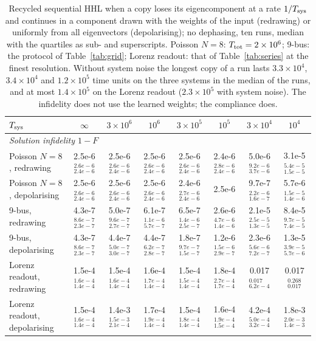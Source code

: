 \documentclass[journal]{IEEEtran}
\begin{document}
\begin{table}[t]
\caption{Recycled sequential HHL when a copy loses its eigencomponent at a rate $1/T_{\rm sys}$ and continues in a component drawn with the weights of the input (redrawing) or uniformly from all eigenvectors (depolarising); no dephasing, ten runs, median with the quartiles as sub- and superscripts. Poisson $N=8$: $T_{\rm tot}=2\times10^6$; 9-bus: the protocol of Table~\ref{tab:grid}; Lorenz readout: that of Table~\ref{tab:series} at the finest resolution. Without system noise the longest copy of a run lasts $3.3\times10^4$, $3.4\times10^4$ and $1.2\times10^5$ time units on the three systems in the median of the runs, and at most $1.4\times10^5$ on the Lorenz readout ($2.3\times10^5$ with system noise). The infidelity does not use the learned weights; the compliance does.}
\label{tab:system}
\centering\footnotesize\renewcommand{\arraystretch}{1.3}
\setlength{\tabcolsep}{3pt}
\begin{tabular}{lccccccc}
\toprule
$T_{\rm sys}$ & $\infty$ & $3\times10^6$ & $10^6$ & $3\times10^5$ & $10^5$ & $3\times10^4$ & $10^4$\\
\midrule
\multicolumn{8}{l}{\emph{Solution infidelity $1-F$}}\\
Poisson $N=8$, redrawing & 2.5e-6$_{2.4e-6}^{2.6e-6}$ & 2.5e-6$_{2.4e-6}^{2.6e-6}$ & 2.5e-6$_{2.4e-6}^{2.6e-6}$ & 2.5e-6$_{2.4e-6}^{2.6e-6}$ & 2.4e-6$_{2.4e-6}^{2.8e-6}$ & 5.0e-6$_{3.7e-6}^{9.2e-6}$ & 3.1e-5$_{1.5e-5}^{5.4e-5}$\\
Poisson $N=8$, depolarising & 2.5e-6$_{2.4e-6}^{2.6e-6}$ & 2.5e-6$_{2.4e-6}^{2.6e-6}$ & 2.5e-6$_{2.4e-6}^{2.6e-6}$ & 2.4e-6$_{2.4e-6}^{2.7e-6}$ & 2.5e-6 & 9.7e-7$_{1.6e-7}^{2.2e-6}$ & 5.7e-6$_{1.4e-6}^{1.5e-5}$\\
9-bus, redrawing & 4.3e-7$_{2.3e-7}^{8.6e-7}$ & 5.0e-7$_{2.7e-7}^{9.6e-7}$ & 6.1e-7$_{5.7e-7}^{1.1e-6}$ & 6.5e-7$_{2.5e-7}^{1.4e-6}$ & 2.6e-6$_{1.4e-6}^{4.7e-6}$ & 2.1e-5$_{1.3e-5}^{2.5e-5}$ & 8.4e-5$_{7.4e-5}^{9.7e-5}$\\
9-bus, depolarising & 4.3e-7$_{2.3e-7}^{8.6e-7}$ & 4.4e-7$_{3.0e-7}^{5.0e-7}$ & 4.4e-7$_{2.8e-7}^{6.2e-7}$ & 1.8e-7$_{1.5e-7}^{9.7e-7}$ & 1.2e-6$_{2.9e-7}^{1.5e-6}$ & 2.3e-6$_{7.2e-7}^{5.6e-6}$ & 1.3e-5$_{5.7e-6}^{3.9e-5}$\\
Lorenz readout, redrawing & 1.5e-4$_{1.4e-4}^{1.6e-4}$ & 1.5e-4$_{1.4e-4}^{1.6e-4}$ & 1.6e-4$_{1.4e-4}^{1.7e-4}$ & 1.5e-4$_{1.4e-4}^{1.5e-4}$ & 1.8e-4$_{1.7e-4}^{2.7e-4}$ & 0.017$_{6.2e-4}^{0.017}$ & 0.017$_{0.017}^{0.268}$\\
Lorenz readout, depolarising & 1.5e-4$_{1.4e-4}^{1.6e-4}$ & 1.4e-3$_{2.1e-4}^{1.5e-3}$ & 1.7e-4$_{1.4e-4}^{1.9e-4}$ & 1.5e-4$_{1.4e-4}^{1.8e-4}$ & 1.6e-4$_{1.5e-4}^{1.9e-4}$ & 4.2e-4$_{3.2e-4}^{5.0e-4}$ & 1.8e-3$_{1.4e-3}^{2.0e-3}$\\

\end{tabular}
\end{table}
\end{document}
